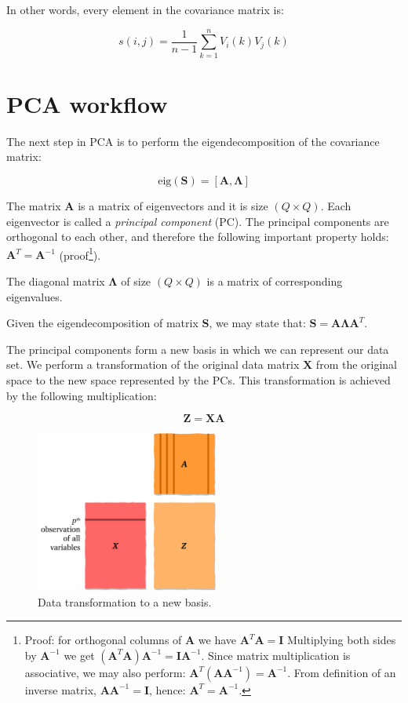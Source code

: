 \documentclass[10pt,twocolumn]{article}
\begin{document}
In other words, every element in the covariance matrix is:

\begin{equation}
s(i,j) = \frac{1}{n-1} \sum\limits_{k=1}^n V_i(k) V_j(k)
\end{equation}



\section{PCA workflow}

The next step in PCA is to perform the eigendecomposition of the covariance matrix:

\begin{equation} \label{eq:eig-dec}
\text{eig}(\bm{S}) = [\bm{A}, \bm{\Lambda}]
\end{equation}

The matrix $\bm{A}$ is a matrix of eigenvectors and it is size $(Q \times Q)$. Each eigenvector is called a \textit{principal component} (PC). The principal components are orthogonal to each other, and therefore the following important property holds: $\bm{A}^T = \bm{A}^{-1}$ (proof\footnote{Proof: for orthogonal columns of $\bm{A}$ we have $\bm{A}^T \bm{A} = \bm{I}$ Multiplying both sides by $\bm{A}^{-1}$ we get $(\bm{A}^T \bm{A}) \bm{A}^{-1}= \bm{I}\bm{A}^{-1}$. Since matrix multiplication is associative, we may also perform: $\bm{A}^T (\bm{A} \bm{A}^{-1}) = \bm{A}^{-1}$. From definition of an inverse matrix,  $\bm{A} \bm{A}^{-1} = \bm{I}$, hence: $\bm{A}^T = \bm{A}^{-1}$.}).

The diagonal matrix $\bm{\Lambda}$ of size $(Q \times Q)$ is a matrix of corresponding eigenvalues.

Given the eigendecomposition of matrix $\bm{S}$, we may state that: $\bm{S} = \bm{A} \bm{\Lambda} \bm{A}^T$.

The principal components form a new basis in which we can represent our data set. We perform a transformation of the original data matrix $\bm{X}$ from the original space to the new space represented by the PCs. This transformation is achieved by the following multiplication:

\begin{equation} \label{eq:data-transform}
\bm{Z} = \bm{X} \bm{A}
\end{equation}

\begin{figure}[H]
\centering\includegraphics[width=6cm]{data-transformation.png}
\caption{Data transformation to a new basis.}
\label{fig:data-transformation}
\end{figure}
\end{document}
